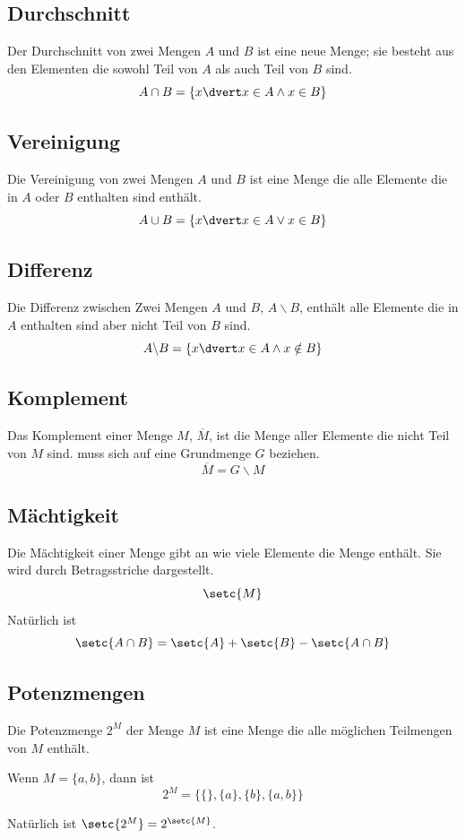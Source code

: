 \documentclass{article}
\begin{document}
\subsection{Durchschnitt}
Der Durchschnitt von zwei Mengen $A$ und $B$ ist eine neue Menge; sie besteht aus den Elementen die sowohl Teil von $A$ als auch Teil von $B$ sind. 
\[
 A \cap B = \{x \dvert x \in A \land x \in B\}
\]

\subsection{Vereinigung}
Die Vereinigung von zwei Mengen $A$ und $B$ ist eine Menge die alle Elemente die in $A$ oder $B$ enthalten sind enthält.
\[
 A \cup B = \{x \dvert x \in A \lor x \in B\}
\]

\subsection{Differenz}
Die Differenz zwischen Zwei Mengen $A$ und $B$, $A \backslash B$, enthält alle Elemente die in $A$ enthalten sind aber nicht Teil von $B$ sind.
\[
 A \backslash B = \{x \dvert x \in A \land x \notin B\}
\]

\subsection{Komplement}
Das Komplement einer Menge $M$, $\overline{M}$, ist die Menge aller Elemente die nicht Teil von $M$ sind.  muss sich auf eine Grundmenge $G$ beziehen. 
\[
 \overline{M} = G \backslash M
\]

\subsection{Mächtigkeit}
Die Mächtigkeit einer Menge gibt an wie viele Elemente die Menge enthält. Sie wird durch Betragsstriche dargestellt.
\[
 \setc{M}
\]
Natürlich ist
\[
 \setc{A \cap B} = \setc{A} + \setc{B} - \setc{A \cap B}
\]

\subsection{Potenzmengen}
Die Potenzmenge $2^M$ der Menge $M$ ist eine Menge die alle möglichen Teilmengen von $M$ enthält.
\begin{zexample}
Wenn $M = \{a,b\}$, dann ist
\[
 2^M = \{\{\},\{a\},\{b\},\{a,b\}\}
\]
\end{zexample}
Natürlich ist $\setc{2^M} = 2^\setc{M}$.
\end{document}
